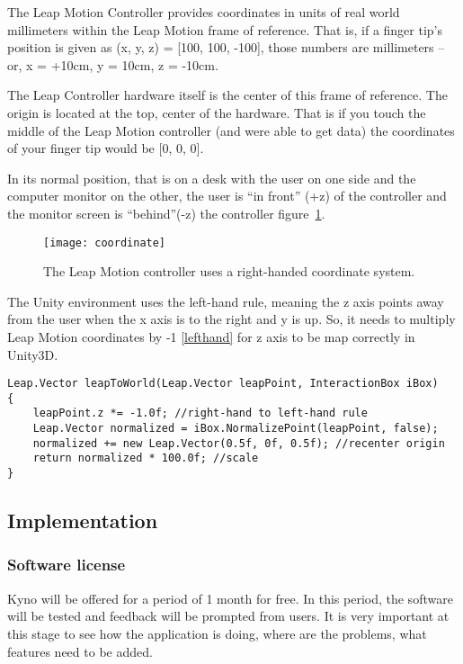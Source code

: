 {\begin{itemize}
The Leap Motion Controller provides coordinates in units of real world millimeters within the Leap Motion frame of reference. That is, if a finger tip’s position is given as (x, y, z) = [100, 100, -100], those numbers are millimeters – or, x = +10cm, y = 10cm, z = -10cm.

The Leap Controller hardware itself is the center of this frame of reference. The origin is located at the top, center of the hardware. That is if you touch the middle of the Leap Motion controller (and were able to get data) the coordinates of your finger tip would be [0, 0, 0].


In its normal position, that is on a desk with the user on one side and the computer monitor on the other, the user is “in front” (+z) of the controller and the monitor screen is “behind”(-z) the controller \mbox{figure \ref{coordinate}}. 

 
\begin{figure}[!h]
\centering
\texttt{[image: coordinate]}
\caption{The Leap Motion controller uses a right-handed coordinate system. \cite{coordinates}}\label{coordinate}
\end{figure}


The Unity environment uses the left-hand rule, meaning the z axis points away from the user when the x axis is to the right and y is up. So, it needs to multiply Leap Motion coordinates by -1 \autoref{lefthand} for z axis to be map correctly in Unity3D.

\begin{lstlisting}[caption={Mapping right hand to left hand rule.},label={lefthand}]
Leap.Vector leapToWorld(Leap.Vector leapPoint, InteractionBox iBox)
{
    leapPoint.z *= -1.0f; //right-hand to left-hand rule
    Leap.Vector normalized = iBox.NormalizePoint(leapPoint, false);
    normalized += new Leap.Vector(0.5f, 0f, 0.5f); //recenter origin
    return normalized * 100.0f; //scale
}

\end{lstlisting}
\end{itemize}


\subsection{Implementation}


\subsubsection{Software license}
Kyno will be offered for a period of 1 month for free. In this period, the software will be tested and feedback will be prompted from users. It is very important at this stage to see how the application is doing, where are the problems, what features need to be added. 

}
